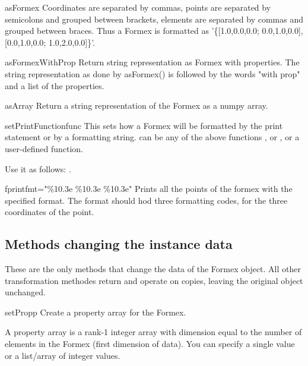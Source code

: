 {{\begin{methoddesc}{asFormex}{}
Coordinates are separated by commas, points are separated by semicolons and grouped between brackets, elements are separated by commas and grouped between braces. Thus a Formex  is formatted as '\{[1.0,0.0,0.0; 0.0,1.0,0.0], [0.0,1.0,0.0; 1.0,2.0,0.0]\}'.
\end{methoddesc}

\begin{methoddesc}{asFormexWithProp}{}
Return string representation as Formex with properties. The string representation as done by asFormex() is followed by the words "with prop" and a list of the properties.
\end{methoddesc}
              
\begin{methoddesc}{asArray}{}
Return a string representation of the Formex as a numpy array.
\end{methoddesc}

\begin{methoddesc}{setPrintFunction}{func}
This sets how a Formex will be formatted by the print statement or by a  formatting string.  can be any of the above functions ,  or , or a user-defined function. 

\classmethod
Use it as follows: .
\end{methoddesc}


\begin{methoddesc}{fprint}{fmt="\%10.3e \%10.3e \%10.3e"}
Prints all the points of the formex with the specified format. The format should hod three formatting codes, for the three coordinates of the point. 
\end{methoddesc}


\subsection{Methods changing the instance data}
These are the only methods that change the data of the Formex object. All other transformation methodes return and operate on copies, leaving the original object unchanged.

\begin{methoddesc}{setProp}{p}
Create a property array for the Formex.

A property array is a rank-1 integer array with dimension equal to the number of elements in the Formex (first dimension of data). You can specify a single value or a list/array of integer values.


\end{methoddesc}}}
